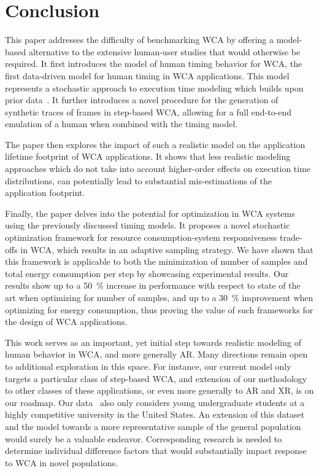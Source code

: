 \section{Conclusion}\label{sec:conclusion}

This paper addresses the difficulty of benchmarking \ac{WCA} by offering a model-based alternative to the extensive human-user studies that would otherwise be required.
It first introduces the \edgedroid{} model of human timing behavior for \ac{WCA}, the first data-driven model for human timing in \ac{WCA} applications.
This model represents a stochastic approach to execution time modeling which builds upon prior data~\cite{olguinmunoz:impact2021}.
It further introduces a novel procedure for the generation of synthetic traces of frames in step-based \ac{WCA}, allowing for a full end-to-end emulation of a human when combined with the timing model.

The paper then explores the impact of such a realistic model on the application lifetime footprint of \ac{WCA} applications.
It shows that less realistic modeling approaches which do not take into account higher-order effects on execution time distributions, can potentially lead to substantial mis-estimations of the application footprint.

Finally, the paper delves into the potential for optimization in \ac{WCA} systems using the previously discussed timing models.
It proposes a novel stochastic optimization framework for resource consumption-system responsiveness trade-offs in \ac{WCA}, which results in an adaptive sampling strategy. 
We have shown that this framework is applicable to both the minimization of number of samples and total energy consumption per step by showcasing experimental results.
Our results show up to a \SI{50}{\percent} increase in performance with respect to state of the art when optimizing for number of samples, and up to a \SI{30}{\percent} improvement when optimizing for energy consumption, thus proving the value of such frameworks for the design of \ac{WCA} applications.

This work serves as an important, yet initial step towards realistic modeling of human behavior in \ac{WCA}, and more generally \ac{AR}.
Many directions remain open to additional exploration in this space.
For instance, our current model only targets a particular class of step-based \ac{WCA}, and extension of our methodology to other classes of these applications, or even more generally to \ac{AR} and \ac{XR}, is on our roadmap.
Our data~\cite{olguinmunoz:impact2021} also only considers young undergraduate students at a highly competitive university in the United States.
An extension of this dataset and the model towards a more representative sample of the general population would surely be a valuable endeavor.
Corresponding research is needed to determine individual difference factors that would substantially impact response to \ac{WCA} in novel populations.

